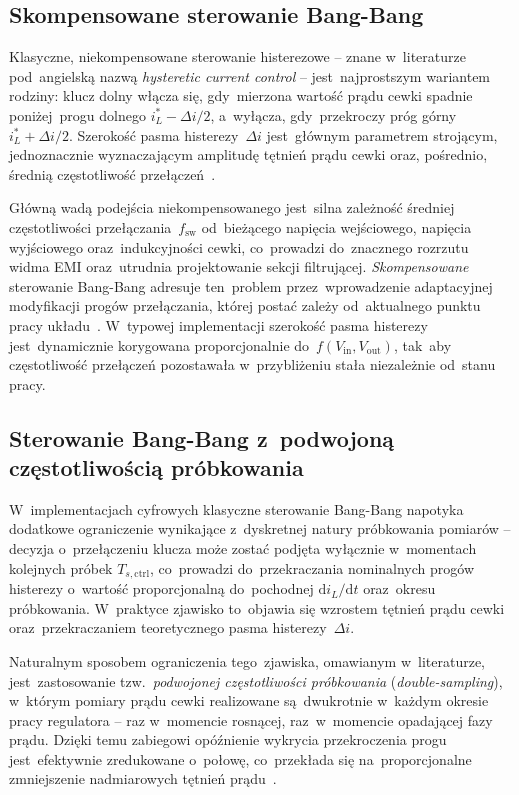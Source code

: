 \subsection{Skompensowane sterowanie Bang-Bang}
\label{subsec:bb-comp}

Klasyczne, niekompensowane sterowanie histerezowe -- znane w~literaturze pod~angielską nazwą \emph{hysteretic current control} -- jest~najprostszym wariantem rodziny: klucz dolny włącza się, gdy~mierzona wartość prądu cewki spadnie poniżej~progu dolnego $i_L^{*} - \Delta i/2$, a~wyłącza, gdy~przekroczy próg górny $i_L^{*} + \Delta i/2$. Szerokość pasma histerezy~$\Delta i$ jest~głównym parametrem strojącym, jednoznacznie wyznaczającym amplitudę tętnień prądu cewki oraz, pośrednio, średnią częstotliwość przełączeń~\cite{tatari2024mfbb}.

Główną wadą podejścia niekompensowanego jest~silna zależność średniej częstotliwości przełączania~$f_{\mathrm{sw}}$ od~bieżącego napięcia wejściowego, napięcia wyjściowego oraz~indukcyjności cewki, co~prowadzi do~znacznego rozrzutu widma EMI oraz~utrudnia projektowanie sekcji filtrującej. \emph{Skompensowane} sterowanie Bang-Bang adresuje ten~problem przez~wprowadzenie adaptacyjnej modyfikacji progów przełączania, której postać zależy od~aktualnego punktu pracy układu~\cite{tatari2024mfbb}. W~typowej implementacji szerokość pasma histerezy jest~dynamicznie korygowana proporcjonalnie do~$f(V_{\mathrm{in}}, V_{\mathrm{out}})$, tak~aby częstotliwość przełączeń pozostawała w~przybliżeniu stała niezależnie od~stanu pracy.

\subsection{Sterowanie Bang-Bang z~podwojoną częstotliwością próbkowania}
\label{subsec:bb-double}

W~implementacjach cyfrowych klasyczne sterowanie Bang-Bang napotyka dodatkowe ograniczenie wynikające z~dyskretnej natury próbkowania pomiarów -- decyzja o~przełączeniu klucza może zostać podjęta wyłącznie w~momentach kolejnych próbek $T_{s,\mathrm{ctrl}}$, co~prowadzi do~przekraczania nominalnych progów histerezy o~wartość proporcjonalną do~pochodnej $\mathrm{d}i_L/\mathrm{d}t$ oraz~okresu próbkowania. W~praktyce zjawisko to~objawia się wzrostem tętnień prądu cewki oraz~przekraczaniem teoretycznego pasma histerezy~$\Delta i$.

Naturalnym sposobem ograniczenia tego~zjawiska, omawianym w~literaturze, jest~zastosowanie tzw.~\emph{podwojonej częstotliwości próbkowania} (\emph{double-sampling}), w~którym pomiary prądu cewki realizowane są~dwukrotnie w~każdym okresie pracy regulatora -- raz w~momencie rosnącej, raz~w~momencie opadającej fazy prądu. Dzięki temu zabiegowi opóźnienie wykrycia przekroczenia progu jest~efektywnie zredukowane o~połowę, co~przekłada się na~proporcjonalne zmniejszenie nadmiarowych tętnień prądu~\cite{tatari2024mfbb}.

